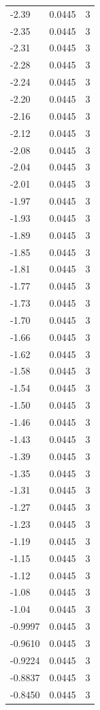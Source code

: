 \begin{longtable}{lrr}
  -2.39 & 0.0445 & 3 \\
  -2.35 & 0.0445 & 3 \\
  -2.31 & 0.0445 & 3 \\
  -2.28 & 0.0445 & 3 \\
  -2.24 & 0.0445 & 3 \\
  -2.20 & 0.0445 & 3 \\
  -2.16 & 0.0445 & 3 \\
  -2.12 & 0.0445 & 3 \\
  -2.08 & 0.0445 & 3 \\
  -2.04 & 0.0445 & 3 \\
  -2.01 & 0.0445 & 3 \\
  -1.97 & 0.0445 & 3 \\
  -1.93 & 0.0445 & 3 \\
  -1.89 & 0.0445 & 3 \\
  -1.85 & 0.0445 & 3 \\
  -1.81 & 0.0445 & 3 \\
  -1.77 & 0.0445 & 3 \\
  -1.73 & 0.0445 & 3 \\
  -1.70 & 0.0445 & 3 \\
  -1.66 & 0.0445 & 3 \\
  -1.62 & 0.0445 & 3 \\
  -1.58 & 0.0445 & 3 \\
  -1.54 & 0.0445 & 3 \\
  -1.50 & 0.0445 & 3 \\
  -1.46 & 0.0445 & 3 \\
  -1.43 & 0.0445 & 3 \\
  -1.39 & 0.0445 & 3 \\
  -1.35 & 0.0445 & 3 \\
  -1.31 & 0.0445 & 3 \\
  -1.27 & 0.0445 & 3 \\
  -1.23 & 0.0445 & 3 \\
  -1.19 & 0.0445 & 3 \\
  -1.15 & 0.0445 & 3 \\
  -1.12 & 0.0445 & 3 \\
  -1.08 & 0.0445 & 3 \\
  -1.04 & 0.0445 & 3 \\
  -0.9997 & 0.0445 & 3 \\
  -0.9610 & 0.0445 & 3 \\
  -0.9224 & 0.0445 & 3 \\
  -0.8837 & 0.0445 & 3 \\
  -0.8450 & 0.0445 & 3 \\

\end{longtable}
